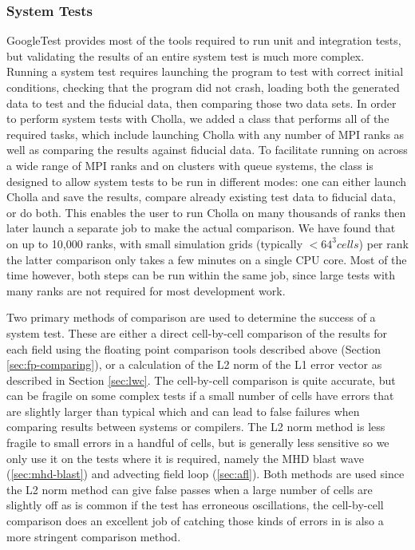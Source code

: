 \subsubsection{System Tests}

GoogleTest provides most of the tools required to run unit and integration tests, but validating the results of an entire system test is much more complex. Running a system test requires launching the program to test with correct initial conditions, checking that the program did not crash, loading both the generated data to test and the fiducial data, then comparing those two data sets. In order to perform system tests with Cholla, we added a class that performs all of the required tasks, which include launching Cholla with any number of MPI ranks as well as comparing the results against fiducial data. To facilitate running on across a wide range of MPI ranks and on clusters with queue systems, the class is designed to allow system tests to be run in different modes: one can either launch Cholla and save the results, compare already existing test data to fiducial data, or do both. This enables the user to run Cholla on many thousands of ranks then later launch a separate job to make the actual comparison. We have found that on up to 10,000 ranks, with small simulation grids (typically $<64^3 cells$) per rank the latter comparison only takes a few minutes on a single CPU core. Most of the time however, both steps can be run within the same job, since large tests with many ranks are not required for most development work.

Two primary methods of comparison are used to determine the success of a system test. These are either a direct cell-by-cell comparison of the results for each field using the floating point comparison tools described above (Section \ref{sec:fp-comparing}), or a calculation of the L2 norm of the L1 error vector as described in Section  \ref{sec:lwc}. The cell-by-cell comparison is quite accurate, but can be fragile on some complex tests if a small number of cells have errors that are slightly larger than typical which and can lead to false failures when comparing results between systems or compilers. The L2 norm method is less fragile to small errors in a handful of cells, but is generally less sensitive so we only use it on the tests where it is required, namely the MHD blast wave (\autoref{sec:mhd-blast}) and advecting field loop (\autoref{sec:afl}). Both methods are used since the L2 norm method can give false passes when a large number of cells are slightly off as is common if the test has erroneous oscillations, the cell-by-cell comparison does an excellent job of catching those kinds of errors in is also a more stringent comparison method.
 
